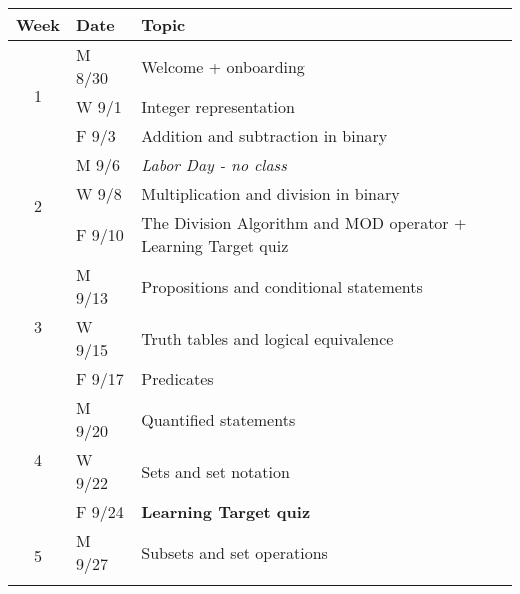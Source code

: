 \documentclass[]{article}
\begin{document}
\begin{table}[H]
\begin{tabular}{|c|l|l|}
\hline
Week                & Date    & Topic                                                                \\ \hline
\multirow{3}{*}{1}  & M 8/30  & Welcome + onboarding                                                 \\ \cline{2-3} 
                    & W 9/1   & Integer representation                                               \\ \cline{2-3} 
                    & F 9/3   & Addition and subtraction in binary                                   \\ \hline
\multirow{3}{*}{2}  & M 9/6   & \textit{Labor Day - no class}                                        \\ \cline{2-3} 
                    & W 9/8   & Multiplication and division in binary                                \\ \cline{2-3} 
                    & F 9/10  & The Division Algorithm and MOD operator + Learning Target quiz       \\ \hline
\multirow{3}{*}{3}  & M 9/13  & Propositions and conditional statements                              \\ \cline{2-3} 
                    & W 9/15  & Truth tables and logical equivalence                                 \\ \cline{2-3} 
                    & F 9/17  & Predicates                                                           \\ \hline
\multirow{3}{*}{4}  & M 9/20  & Quantified statements                                                \\ \cline{2-3} 
                    & W 9/22  & Sets and set notation                                                \\ \cline{2-3} 
                    & F 9/24  & \textbf{Learning Target quiz}                                        \\ \hline
\multirow{3}{*}{5}  & M 9/27  & Subsets and set operations                                           \\ \cline{2-3} 

\end{tabular}
\end{table}
\end{document}
